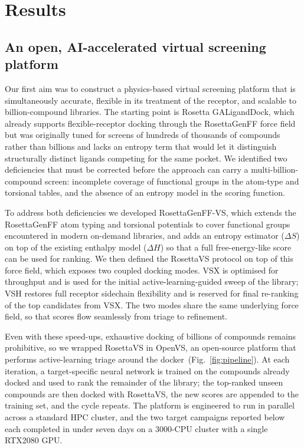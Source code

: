 \documentclass[11pt]{article}
\begin{document}
\section{Results}

\subsection{An open, AI-accelerated virtual screening platform}

Our first aim was to construct a physics-based virtual screening platform
that is simultaneously accurate, flexible in its treatment of the receptor,
and scalable to billion-compound libraries. The starting point is Rosetta
GALigandDock, which already supports flexible-receptor docking through the
RosettaGenFF force field but was originally tuned for screens of hundreds
of thousands of compounds rather than billions and lacks an entropy term
that would let it distinguish structurally distinct ligands competing for
the same pocket. We identified two deficiencies that must be corrected
before the approach can carry a multi-billion-compound screen: incomplete
coverage of functional groups in the atom-type and torsional tables, and
the absence of an entropy model in the scoring function.

To address both deficiencies we developed RosettaGenFF-VS, which extends
the RosettaGenFF atom typing and torsional potentials to cover functional
groups encountered in modern on-demand libraries, and adds an entropy
estimator ($\Delta S$) on top of the existing enthalpy model ($\Delta H$)
so that a full free-energy-like score can be used for ranking. We then
defined the RosettaVS protocol on top of this force field, which exposes
two coupled docking modes. VSX is optimised for throughput and is used
for the initial active-learning-guided sweep of the library; VSH restores
full receptor sidechain flexibility and is reserved for final re-ranking
of the top candidates from VSX. The two modes share the same underlying
force field, so that scores flow seamlessly from triage to refinement.

Even with these speed-ups, exhaustive docking of billions of compounds
remains prohibitive, so we wrapped RosettaVS in OpenVS, an open-source
platform that performs active-learning triage around the
docker~(Fig.~\ref{fig:pipeline}). At each iteration, a target-specific
neural network is trained on the compounds already docked and used to
rank the remainder of the library; the top-ranked unseen compounds are
then docked with RosettaVS, the new scores are appended to the training
set, and the cycle repeats. The platform is engineered to run in parallel
across a standard HPC cluster, and the two target campaigns reported
below each completed in under seven days on a 3000-CPU cluster with a
single RTX2080 GPU.
\end{document}
